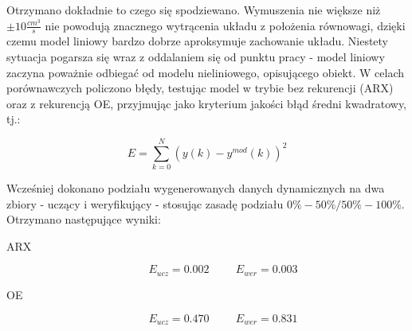 \documentclass[a4paper,titlepage,11pt,floatssmall]{mwrep}
\begin{document}
Otrzymano dokładnie to czego się spodziewano. Wymuszenia nie większe niż $\pm 10 \frac{cm^3}{s}$ nie powodują znacznego wytrącenia układu z położenia równowagi, dzięki czemu model liniowy bardzo dobrze aproksymuje zachowanie układu. Niestety sytuacja pogarsza się wraz z oddalaniem się od punktu pracy - model liniowy zaczyna poważnie odbiegać od modelu nieliniowego, opisującego obiekt. W celach porównawczych policzono błędy, testując model w trybie bez rekurencji (ARX) oraz z rekurencją OE, przyjmując jako kryterium jakości błąd średni kwadratowy, tj.:

\begin{equation}
E = \sum_{k=0}^N (y(k) - y^{mod}(k))^2
\end{equation}

\noindent Wcześniej dokonano podziału wygenerowanych danych dynamicznych na dwa zbiory - uczący i weryfikujący - stosując zasadę podziału $0\% - 50\% / 50\% - 100\%$. Otrzymano następujące wyniki:

\begin{description}
\item[ARX] 
\begin{equation}
E_{ucz} = \num{0.002} \hspace{1cm} E_{wer}=\num{0.003}
\end{equation}
\item[OE] 
\begin{equation}
E_{ucz} = \num{0.470} \hspace{1cm} E_{wer}=\num{0.831}
\end{equation}
\end{description}

\end{document}
